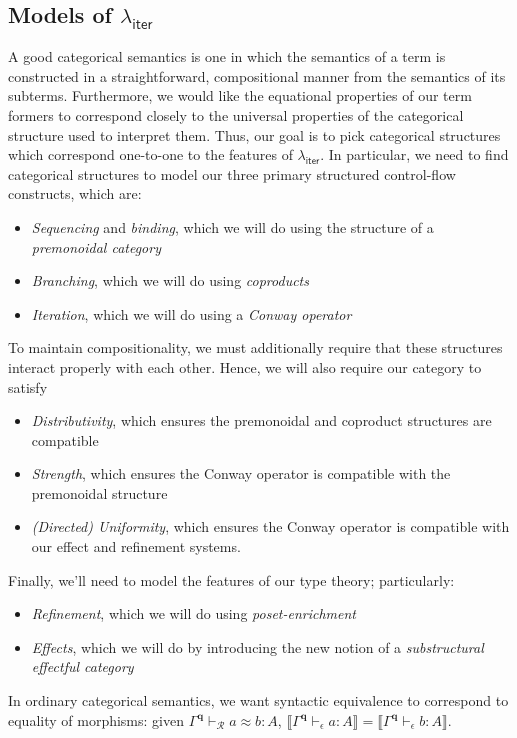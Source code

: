 \documentclass[acmsmall,screen,review]{acmart}
\newcommand{\mc}[1]{\ensuremath{\mathcal{#1}}}
\newcommand{\mb}[1]{\ensuremath{\mathbf{#1}}}
\newcommand{\ms}[1]{\ensuremath{\mathsf{#1}}}
\newcommand{\hasty}[4]{#1 \vdash_{#2} #3: {#4}}
\newcommand{\teqv}{\approx}
\newcommand{\tmeq}[5]{#1 \vdash_{#2} #3 \teqv #4 : {#5}}
\newcommand{\dnt}[1]{\llbracket{#1}\rrbracket}
\newcommand{\subiterexp}{\texorpdfstring{\(\lambda_{\ms{iter}}\)}{lambda-iter}}
\begin{document}
\subsection{Models of \subiterexp{}}

A good categorical semantics is one in which the semantics of a term is constructed in a
straightforward, compositional manner from the semantics of its subterms. Furthermore, we would like
the equational properties of our term formers to correspond closely to the universal properties of
the categorical structure used to interpret them. Thus, our goal is to pick categorical structures
which correspond  one-to-one to the features of \subiterexp{}. In
particular, we need to find categorical structures to model our three primary structured
control-flow constructs, which are:
\begin{itemize}
  \item \emph{Sequencing} and \emph{binding}, which we will do using the structure of a
  \emph{premonoidal category}
  \item \emph{Branching}, which we will do using \emph{coproducts}
  \item \emph{Iteration}, which we will do using a \emph{Conway operator}
\end{itemize}
To maintain compositionality, we must additionally require that these structures interact properly 
with each other. Hence, we will also require our category to satisfy
\begin{itemize}
  \item \emph{Distributivity}, which ensures the premonoidal and coproduct structures are compatible
  \item \emph{Strength}, which ensures the Conway operator is compatible with the premonoidal
  structure
  \item \emph{(Directed) Uniformity}, which ensures the Conway operator is compatible with our
  effect and refinement systems.
\end{itemize}
Finally, we'll need to model the features of our type theory; particularly:
\begin{itemize}
  \item \emph{Refinement}, which we will do using \emph{poset-enrichment}
  \item \emph{Effects}, which we will do by introducing the new notion of a \emph{substructural
  effectful category}
\end{itemize}

In ordinary categorical semantics, we want syntactic equivalence to
correspond to equality of morphisms: given $\tmeq{\Gamma^{\mb{q}}}{\mc{R}}{a}{b}{A}$,
$\dnt{\hasty{\Gamma^{\mb{q}}}{\epsilon}{a}{A}} = \dnt{\hasty{\Gamma^{\mb{q}}}{\epsilon}{b}{A}}$. 
\end{document}
